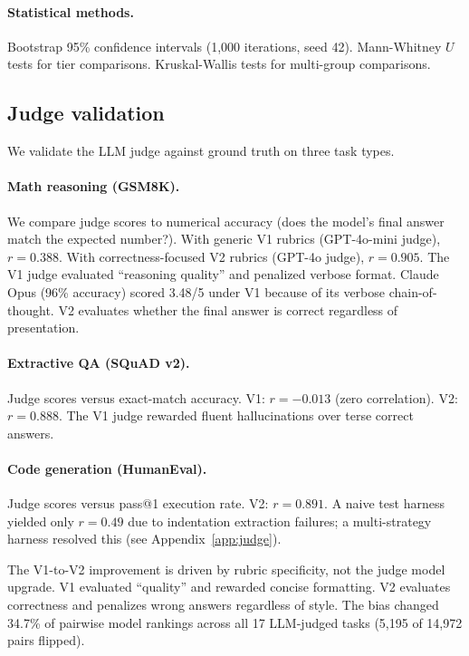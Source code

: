 \documentclass[11pt]{article}
\begin{document}
\paragraph{Statistical methods.}
Bootstrap 95\% confidence intervals (1{,}000 iterations, seed 42).
Mann-Whitney $U$ tests for tier comparisons.  Kruskal-Wallis tests for
multi-group comparisons.

\subsection{Judge validation}
\label{sec:judge-validation}

We validate the LLM judge against ground truth on three task types.

\paragraph{Math reasoning (GSM8K).}
We compare judge scores to numerical accuracy (does the model's final
answer match the expected number?).  With generic V1 rubrics (GPT-4o-mini
judge), $r = 0.388$.  With correctness-focused V2 rubrics (GPT-4o judge),
$r = 0.905$.  The V1 judge evaluated ``reasoning quality'' and penalized
verbose format.  Claude Opus (96\% accuracy) scored 3.48/5 under V1
because of its verbose chain-of-thought.  V2 evaluates whether the final
answer is correct regardless of presentation.

\paragraph{Extractive QA (SQuAD v2).}
Judge scores versus exact-match accuracy.  V1: $r = -0.013$ (zero
correlation).  V2: $r = 0.888$.  The V1 judge rewarded fluent
hallucinations over terse correct answers.

\paragraph{Code generation (HumanEval).}
Judge scores versus pass@1 execution rate.  V2: $r = 0.891$.  A naive
test harness yielded only $r = 0.49$ due to indentation extraction
failures; a multi-strategy harness resolved this (see Appendix~\ref{app:judge}).

The V1-to-V2 improvement is driven by rubric specificity, not the judge
model upgrade.  V1 evaluated ``quality'' and rewarded concise formatting.
V2 evaluates correctness and penalizes wrong answers regardless of style.
The bias changed 34.7\% of pairwise model rankings across all 17
LLM-judged tasks (5{,}195 of 14{,}972 pairs flipped).
\end{document}
